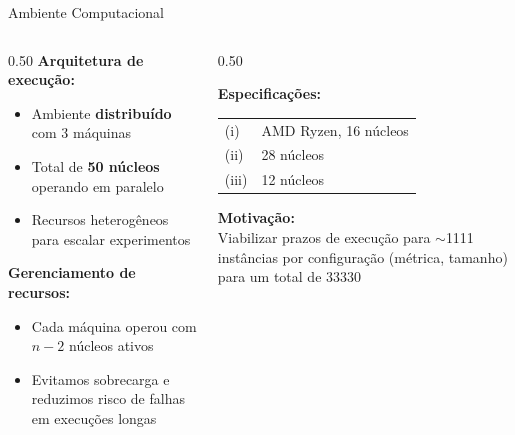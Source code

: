 \documentclass[11pt, xcolor=dvipsnames]{beamer}
\newcommand{\destaque}[1]{\textbf{\textcolor{verde}{#1}}}
\begin{document}
\begin{frame}{Ambiente Computacional}
  \footnotesize
  \begin{columns}[T]
    \begin{column}{0.50\textwidth}
      \textbf{Arquitetura de execução:}
      \begin{itemize}
        \item Ambiente \destaque{distribuído} com 3 máquinas
        \item Total de \destaque{50 núcleos} operando em paralelo
        \item Recursos heterogêneos para escalar experimentos
      \end{itemize}
      \vspace{3mm}
      \textbf{Gerenciamento de recursos:}
      \begin{itemize}
        \item Cada máquina operou com $n - 2$ núcleos ativos
        \item Evitamos sobrecarga e reduzimos risco de falhas em execuções longas
      \end{itemize}
    \end{column}
    \begin{column}{0.50\textwidth}
      \begin{calloutbox}
        {\scriptsize
        \textbf{Especificações:} \\[2mm]
        \begin{tabular}{@{}ll@{}}
          (i)   & AMD Ryzen, 16 núcleos \\
          (ii)  & 28 núcleos \\
          (iii) & 12 núcleos \\
        \end{tabular}
        }
      \end{calloutbox}
      \vspace{2mm}
      \begin{alertbox}
        {\scriptsize
        \textbf{Motivação:} \\
        Viabilizar prazos de execução para $\sim$1111 instâncias por configuração (métrica, tamanho) para um total de 33330
        }
      \end{alertbox}
    \end{column}
  \end{columns}
\end{frame}
\end{document}
